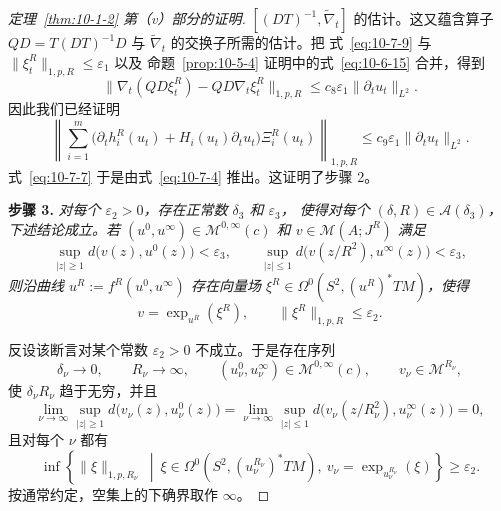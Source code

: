 \begin{proof}[定理~\ref{thm:10-1-2} 第（v）部分的证明]
$[(DT)^{-1},\widetilde\nabla_t]$ 的估计。这又蕴含算子
$QD=T(DT)^{-1}D$ 与 $\widetilde\nabla_t$ 的交换子所需的估计。把
式~\eqref{eq:10-7-9} 与
$\lVert\xi_t^R\rVert_{1,p,R}\leq\varepsilon_1$ 以及
命题~\ref{prop:10-5-4} 证明中的式~\eqref{eq:10-6-15} 合并，得到
\[
  \bigl\lVert\nabla_t(QD\xi_t^R)-QD\nabla_t\xi_t^R\bigr\rVert_{1,p,R}
  \leq c_8\varepsilon_1\lVert\partial_tu_t\rVert_{L^2}.
\]
因此我们已经证明
\[
  \left\lVert\sum_{i=1}^m
  \bigl(\partial_th_i^R(u_t)+H_i(u_t)\partial_tu_t\bigr)\Xi_i^R(u_t)
  \right\rVert_{1,p,R}
  \leq c_9\varepsilon_1\lVert\partial_tu_t\rVert_{L^2}.
\]
式~\eqref{eq:10-7-7} 于是由式~\eqref{eq:10-7-4} 推出。这证明了步骤 2。

\medskip
\noindent\textbf{步骤 3.}
\emph{对每个 $\varepsilon_2>0$，存在正常数 $\delta_3$ 和 $\varepsilon_3$，
使得对每个 $(\delta,R)\in\mathcal A(\delta_3)$，下述结论成立。若
$(u^0,u^\infty)\in\mathcal M^{0,\infty}(c)$ 和
$v\in\mathcal M(A;J^R)$ 满足}
\begin{equation}\label{eq:10-7-10}
  \sup_{|z|\geq1}d\bigl(v(z),u^0(z)\bigr)<\varepsilon_3,
  \qquad
  \sup_{|z|\leq1}d\bigl(v(z/R^2),u^\infty(z)\bigr)<\varepsilon_3,
\end{equation}
\emph{则沿曲线 $u^R:=f^R(u^0,u^\infty)$ 存在向量场
$\xi^R\in\Omega^0(S^2,(u^R)^*TM)$，使得}
\begin{equation}\label{eq:10-7-11}
  v=\exp_{u^R}(\xi^R),
  \qquad \lVert\xi^R\rVert_{1,p,R}\leq\varepsilon_2.
\end{equation}

反设该断言对某个常数 $\varepsilon_2>0$ 不成立。于是存在序列
\[
  \delta_\nu\longrightarrow0,\qquad R_\nu\longrightarrow\infty,\qquad
  (u_\nu^0,u_\nu^\infty)\in\mathcal M^{0,\infty}(c),
  \qquad v_\nu\in\mathcal M^{R_\nu},
\]
使 $\delta_\nu R_\nu$ 趋于无穷，并且
\[
  \lim_{\nu\to\infty}\sup_{|z|\geq1}
  d\bigl(v_\nu(z),u_\nu^0(z)\bigr)
  =\lim_{\nu\to\infty}\sup_{|z|\leq1}
  d\bigl(v_\nu(z/R_\nu^2),u_\nu^\infty(z)\bigr)=0,
\]
且对每个 $\nu$ 都有
\begin{equation}\label{eq:10-7-12}
  \inf\left\{
  \lVert\xi\rVert_{1,p,R_\nu}\ \middle|\
  \xi\in\Omega^0(S^2,(u_\nu^{R_\nu})^*TM),\ 
  v_\nu=\exp_{u_\nu^{R_\nu}}(\xi)
  \right\}\geq\varepsilon_2.
\end{equation}
按通常约定，空集上的下确界取作 $\infty$。


\end{proof}
